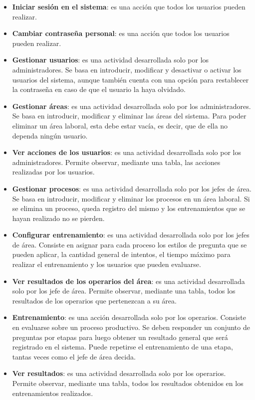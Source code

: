 \begin{itemize}
\item \textbf{Iniciar sesión en el sistema}: es una acción que todos los usuarios pueden realizar.
\item \textbf{Cambiar contraseña personal}: es una acción que todos los usuarios pueden realizar.
\item \textbf{Gestionar usuarios}: es una actividad desarrollada solo por los administradores. Se basa en introducir, modificar y desactivar o activar los usuarios del sistema, aunque también cuenta con una opción para restablecer la contraseña en caso de que el usuario la haya olvidado.
\item \textbf{Gestionar áreas}: es una actividad desarrollada solo por los administradores. Se basa en introducir, modificar y eliminar las áreas del sistema. Para poder eliminar un área laboral, esta debe estar vacía, es decir, que de ella no dependa ningún usuario.
\item \textbf{Ver acciones de los usuarios}: es una actividad desarrollada solo por los administradores. Permite observar, mediante una tabla, las acciones realizadas por los usuarios.
\item \textbf{Gestionar procesos}: es una actividad desarrollada solo por los jefes de área. Se basa en introducir, modificar y eliminar los procesos en un área laboral. Si se elimina un proceso, queda registro del mismo y los entrenamientos que se hayan realizado no se pierden.
\item \textbf{Configurar entrenamiento}: es una actividad desarrollada solo por los jefes de área. Consiste en asignar para cada proceso los estilos de pregunta que se pueden aplicar, la cantidad general de intentos, el tiempo máximo para realizar el entrenamiento y los usuarios que pueden evaluarse.
\item \textbf{Ver resultados de los operarios del área}: es una actividad desarrollada solo por los jefe de área. Permite observar, mediante una tabla, todos los resultados de los operarios que pertenezcan a su área.
\item \textbf{Entrenamiento}: es una acción desarrollada solo por los operarios. Consiste en evaluarse sobre un proceso productivo. Se deben responder un conjunto de preguntas por etapas para luego obtener un resultado general que será registrado en el sistema. Puede repetirse el entrenamiento de una etapa, tantas veces como el jefe de área decida.
\item \textbf{Ver resultados}: es una actividad desarrollada solo por los operarios. Permite observar, mediante una tabla, todos los resultados obtenidos en los entrenamientos realizados.
\end{itemize}

